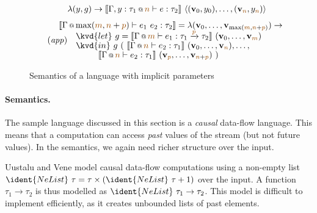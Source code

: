 \begin{figure}
\begin{equation}
\begin{array}{l}
  \qquad\lambda (y, g) \rightarrow \sem{ \coctx{\Gamma,y:\tau_1}{\aclrd{n}} \vdash e : \tau_2 
    }~\langle (\mathbf{v}_0, y_0), \ldots, (\mathbf{v}_{ \aclrd{n}  }, y_{ \aclrd{n} } ) \rangle
\end{array}
\end{equation}
\vspace{-0.5em}
\begin{equation*}
\tag{\emph{app}}
\hspace{-1.5em}
\begin{array}{l}
  \sem{\coctx{\Gamma}{\textnormal{max}(\aclrd{m}, \aclrd{n}+\aclrd{p})} \vdash e_1~e_2 : \tau_2 } = 
    \lambda (\mathbf{v}_0, \ldots, \mathbf{v}_{ \textnormal{max}(\aclrd{m}, \aclrd{n}+\aclrd{p}) } ) \rightarrow \\[-0.1em]
  \qquad\kvd{let}~g=\sem{ \coctx{\Gamma}{\aclrd{m}} \vdash e_1 : \tau_1 \xrightarrow{\aclrd{p}} \tau_2 
    }~(\mathbf{v}_0, \ldots, \mathbf{v}_{ \aclrd{m} })\\[-0.1em]
  \qquad\kvd{in}~g~(~\sem{ \coctx{\Gamma}{\aclrd{n}} \vdash e_2 : \tau_1 }~(\mathbf{v}_0, \ldots, \mathbf{v}_{ \aclrd{n} }),\ldots, \\[-0.1em]
  \qquad\qquad\;~\sem{ \coctx{\Gamma}{\aclrd{n}} \vdash e_2 : \tau_1 }~(\mathbf{v}_{ \aclrd{p} }, \ldots, \mathbf{v}_{ \aclrd{n}+\aclrd{p} })~)
\end{array}
\end{equation*}

\caption{Semantics of a language with implicit parameters}
\label{fig:applications-flat-dfsem}
\end{figure}


\paragraph{Semantics.}
The sample language discussed in this section is a \emph{causal} data-flow language. This means that
a computation can access \emph{past} values of the stream (but not future values). In the semantics, 
we again need richer structure over the input.

Uustalu and Vene \cite{comonads-notions} model causal data-flow computations using a non-empty list
$\ident{NeList}~\tau = \tau \times (\ident{NeList}~\tau + 1)$ over the input. A function $\tau_1 \rightarrow \tau_2$
is thus modelled as $\ident{NeList}~\tau_1 \rightarrow \tau_2$. This model is difficult to implement
efficiently, as it creates unbounded lists of past elements.

